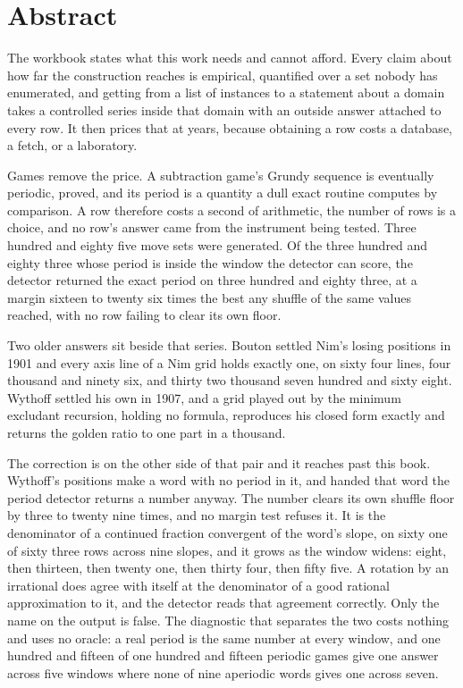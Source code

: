 \chapter*{Abstract}

The workbook states what this work needs and cannot afford. Every claim about how far the
construction reaches is empirical, quantified over a set nobody has enumerated, and getting from a
list of instances to a statement about a domain takes a controlled series inside that domain with an
outside answer attached to every row. It then prices that at years, because obtaining a row costs a
database, a fetch, or a laboratory.

Games remove the price. A subtraction game's Grundy sequence is eventually periodic, proved, and its
period is a quantity a dull exact routine computes by comparison. A row therefore costs a second of
arithmetic, the number of rows is a choice, and no row's answer came from the instrument being
tested. Three hundred and eighty five move sets were generated. Of the three hundred and eighty
three whose period is inside the window the detector can score, the detector returned the exact
period on three hundred and eighty three, at a margin sixteen to twenty six times the best any
shuffle of the same values reached, with no row failing to clear its own floor.

Two older answers sit beside that series. Bouton settled Nim's losing positions in 1901 and every
axis line of a Nim grid holds exactly one, on sixty four lines, four thousand and ninety six, and
thirty two thousand seven hundred and sixty eight. Wythoff settled his own in 1907, and a grid
played out by the minimum excludant recursion, holding no formula, reproduces his closed form
exactly and returns the golden ratio to one part in a thousand.

The correction is on the other side of that pair and it reaches past this book. Wythoff's positions
make a word with no period in it, and handed that word the period detector returns a number anyway.
The number clears its own shuffle floor by three to twenty nine times, and no margin test refuses it.
It is the denominator of a continued fraction convergent of the word's slope, on sixty one of sixty
three rows across nine slopes, and it grows as the window widens: eight, then thirteen, then twenty
one, then thirty four, then fifty five. A rotation by an irrational does agree with itself at the
denominator of a good rational approximation to it, and the detector reads that agreement correctly.
Only the name on the output is false. The diagnostic that separates the two costs nothing and uses
no oracle: a real period is the same number at every window, and one hundred and fifteen of one
hundred and fifteen periodic games give one answer across five windows where none of nine aperiodic
words gives one across seven.

